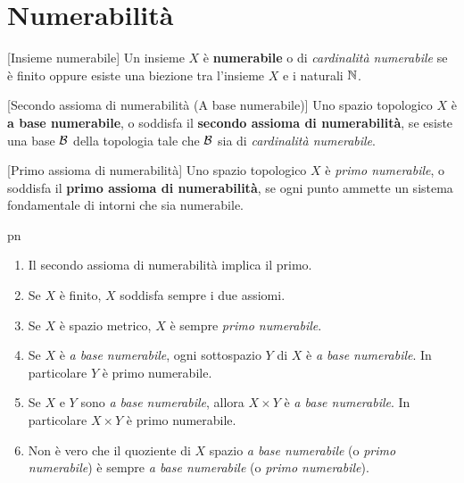 \section{Numerabilità}
\begin{definition}{}[Insieme numerabile]
Un insieme $X$ è \textbf{numerabile} o di \textit{cardinalità numerabile} se è finito oppure esiste una biezione tra l'insieme $X$ e i naturali $\mathbb{N}$.
\end{definition}
\begin{definition}{}[Secondo assioma di numerabilità {(A base numerabile)}]
Uno spazio topologico $X$ è \textbf{a base numerabile}, o soddisfa il \textbf{{\small secondo assioma di numerabilità}}, se esiste una base $\mathcal{B}$ della topologia tale che $\mathcal{B}$ sia di \textit{cardinalità numerabile}.
\end{definition}
\begin{definition}{}[Primo assioma di numerabilità]
Uno spazio topologico $X$ è \textit{primo numerabile}, o soddisfa il \textbf{primo assioma di numerabilità}, se ogni punto ammette un sistema fondamentale di intorni che sia numerabile.
\end{definition}
\begin{remark}{pn}~{}\label{metrico implica primo num}
\begin{enumerate}
\item Il secondo assioma di numerabilità implica il primo.
\item Se $X$ è finito, $X$ soddisfa sempre i due assiomi.
\item Se $X$ è spazio metrico, $X$ è sempre \textit{primo numerabile}.
\item Se $X$ è \textit{a base numerabile}, ogni sottospazio $Y$ di $X$ è \textit{a base numerabile}. In particolare $Y$ è primo numerabile.
\item Se $X$ e $Y$ sono \textit{a base numerabile}, allora $X\times Y$ è \textit{a base numerabile}. In particolare $X\times Y$ è primo numerabile.
\item Non è vero che il quoziente di $X$ spazio \textit{a base numerabile} (o \textit{primo numerabile}) è sempre \textit{a base numerabile} (o \textit{primo numerabile}).
\end{enumerate}
\end{remark}
